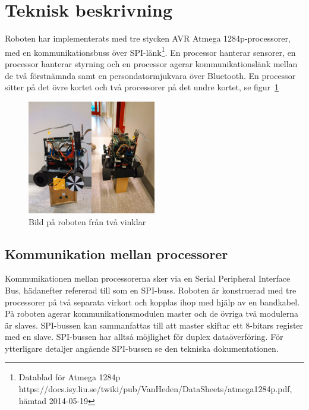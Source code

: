 \documentclass[a4paper,12pt,fleqn]{article}
\begin{document}
\section{Teknisk beskrivning}
Roboten har implementerats med tre stycken AVR Atmega 1284p-processorer, med en kommunikationsbuss över SPI-länk\footnote{Datablad för Atmega 1284p https://docs.isy.liu.se/twiki/pub/VanHeden/DataSheets/atmega1284p.pdf, hämtad 2014-05-19}. En processor hanterar sensorer, en processor hanterar styrning och en processor agerar kommunikationslänk mellan de två förstnämnda samt en persondatormjukvara över Bluetooth. En processor sitter på det övre kortet och två processorer på det undre kortet, se figur~\ref{fig:robot}

\begin{figure}[htp] %
  \begin{center}
  \includegraphics[keepaspectratio=true,width=0.5\textwidth]{robot.png}  %
  \end{center}
  \caption{Bild på roboten från två vinklar} %
  \label{fig:robot}
\end{figure}

\subsection{Kommunikation mellan processorer}
Kommunikationen mellan processorerna sker via en Serial Peripheral Interface Bus, hädanefter refererad till som en SPI-buss.
Roboten är konstruerad med tre processorer på två separata virkort och kopplas ihop med hjälp av en bandkabel. På roboten agerar kommunikationsmodulen master och de övriga två modulerna är slaves. SPI-bussen kan sammanfattas till att master skiftar ett 8-bitars register med en slave. SPI-bussen har alltså möjlighet för duplex dataöverföring. För ytterligare detaljer angående SPI-bussen se den tekniska dokumentationen.
\end{document}
